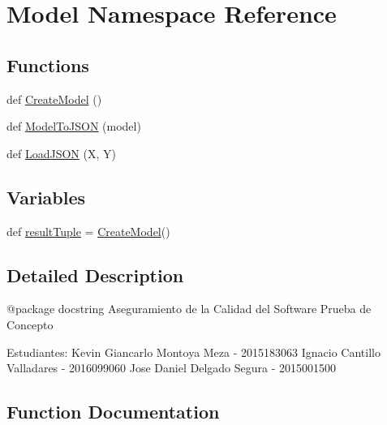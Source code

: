 \hypertarget{namespace_model}{}\section{Model Namespace Reference}
\label{namespace_model}
\subsection*{Functions}
\begin{DoxyCompactItemize}
\item 
def \mbox{\hyperlink{namespace_model_ad001b309b55da5b0fee0d0a29b25d8ac}{Create\+Model}} ()
\item 
def \mbox{\hyperlink{namespace_model_a00000312b074c9b8f27c20faf6142dc6}{Model\+To\+J\+S\+ON}} (model)
\item 
def \mbox{\hyperlink{namespace_model_ab5aefd3f4349b6970ea3fc77e0aed9c8}{Load\+J\+S\+ON}} (X, Y)
\end{DoxyCompactItemize}
\subsection*{Variables}
\begin{DoxyCompactItemize}
\item 
def \mbox{\hyperlink{namespace_model_a582b7be73263e6c6dd3a72ad8704dcab}{result\+Tuple}} = \mbox{\hyperlink{namespace_model_ad001b309b55da5b0fee0d0a29b25d8ac}{Create\+Model}}()
\end{DoxyCompactItemize}


\subsection{Detailed Description}
\begin{DoxyVerb}@package docstring
Aseguramiento de la Calidad del Software
Prueba de Concepto

Estudiantes:
Kevin Giancarlo Montoya Meza - 2015183063
Ignacio Cantillo Valladares - 2016099060
Jose Daniel Delgado Segura - 2015001500
\end{DoxyVerb}
 

\subsection{Function Documentation}
\mbox{\label{namespace_model_ad001b309b55da5b0fee0d0a29b25d8ac}} 
